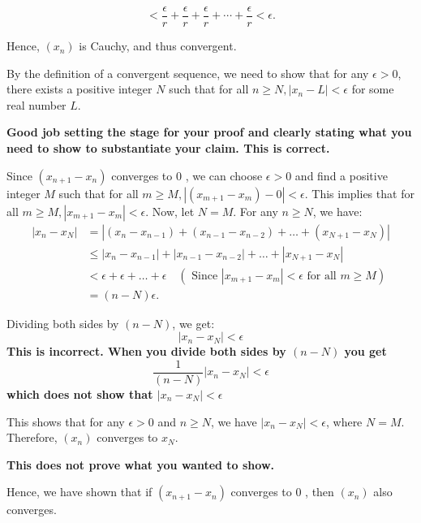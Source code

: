 \documentclass{report}
\begin{document}
$$< \frac{\epsilon}{r} + \frac{\epsilon}{r} + \frac{\epsilon}{r} + \cdots + \frac{\epsilon}{r} < \epsilon.$$

Hence, $(x_n)$ is Cauchy, and thus convergent.

\pagebreak
{}
By the definition of a convergent sequence, we need to show that for any $\epsilon>0$, there exists a positive integer $N$ such that for all $n \geq N,\left|x_n-L\right|<\epsilon$ for some real number $L$.

\textbf{Good job setting the stage for your proof and clearly stating what you need to show to substantiate your claim. This is correct.}

Since $\left(x_{n+1}-x_n\right)$ converges to 0 , we can choose $\epsilon>0$ and find a positive integer $M$ such that for all $m \geq M,\left|\left(x_{m+1}-x_m\right)-0\right|<\epsilon$. This implies that for all $m \geq M,\left|x_{m+1}-x_m\right|<\epsilon$.
Now, let $N=M$. For any $n \geq N$, we have:
$$
\begin{aligned}
\left|x_n-x_N\right| & =\left|\left(x_n-x_{n-1}\right)+\left(x_{n-1}-x_{n-2}\right)+\ldots+\left(x_{N+1}-x_N\right)\right| \\
& \leq\left|x_n-x_{n-1}\right|+\left|x_{n-1}-x_{n-2}\right|+\ldots+\left|x_{N+1}-x_N\right| \\
& <\epsilon+\epsilon+\ldots+\epsilon \quad\left(\text { Since }\left|x_{m+1}-x_m\right|<\epsilon \text { for all } m \geq M\right) \\
& =(n-N) \epsilon .
\end{aligned}
$$

Dividing both sides by $(n-N)$, we get:
$$
\left|x_n-x_N\right|<\epsilon
$$
\textbf{This is incorrect. When you divide both sides by $(n-N)$
you get
$$
\frac{1}{(n-N)}\left|x_n-x_N\right|<\epsilon
$$
which does not show that $\left|x_n-x_N\right|<\epsilon$
}

This shows that for any $\epsilon>0$ and $n \geq N$, we have $\left|x_n-x_N\right|<\epsilon$, where $N=M$. Therefore, $\left(x_n\right)$ converges to $x_N$.

\textbf{This does not prove what you wanted to show. }

Hence, we have shown that if $\left(x_{n+1}-x_n\right)$ converges to 0 , then $\left(x_n\right)$ also converges.
\end{document}
